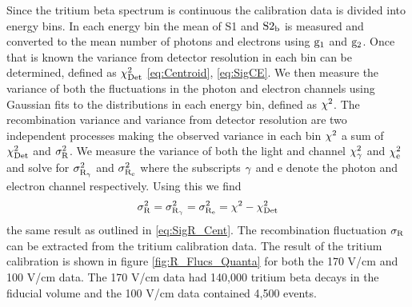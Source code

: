 Since the tritium beta spectrum is continuous the calibration data is divided into energy bins. In each energy bin the mean of S1 and $\rm S2_b$ is measured and converted to the mean number of photons and electrons using $\rm g_1$ and $\rm g_2$. Once that is known the variance from detector resolution in each bin can be determined, defined as $\rm \chi_{Det}^2$ \ref{eq:Centroid}, \ref{eq:SigCE}. We then measure the variance of both the fluctuations in the photon and electron channels using Gaussian fits to the distributions in each energy bin, defined as $\rm \chi^2$. The recombination variance and variance from detector resolution are two independent processes making the observed variance in each bin $\rm \chi^2$ a sum of $\rm \chi_{Det}^2$ and $\rm \sigma_R^2$. We measure the variance of both the light and channel $\rm \chi_{\gamma}^2$ and $\rm \chi_e^2$ and solve for $\rm \sigma_{R_\gamma}^2$ and $\rm \sigma_{R_e}^2$ where the subscripts $\rm \gamma$ and e denote the photon and electron channel respectively. Using this we find
\begin{equation}
\rm \sigma_R^2 = \sigma_{R_\gamma}^2 = \sigma_{R_e}^2 = \chi^2-\chi_{Det}^2
\end{equation}
\noindent the same result as outlined in \ref{eq:SigR_Cent}. The recombination fluctuation $\rm \sigma_R$ can be extracted from the tritium calibration data. The result of the tritium calibration is shown in figure \ref{fig:R_Flucs_Quanta} for both the 170 V/cm and 100 V/cm data. The 170 V/cm data had 140,000 tritium beta decays in the fiducial volume and the 100 V/cm data contained 4,500 events. 


%

